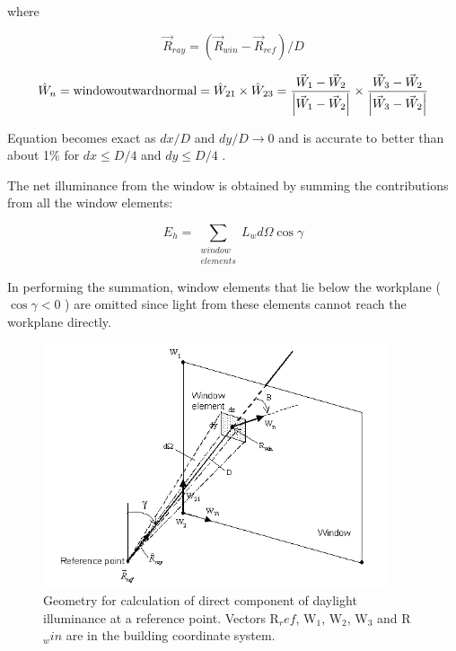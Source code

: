 where

\begin{equation}
{\vec R_{ray}} = ({\vec R_{win}} - {\vec R_{ref}})/D
\end{equation}

\begin{equation}
{\hat W_n} = {\rm{ window outward normal }} = {\hat W_{21}} \times {\hat W_{23}} = \frac{{{{\vec W}_1} - {{\vec W}_2}}}{{\left| {{{\vec W}_1} - {{\vec W}_2}} \right|}} \times \frac{{{{\vec W}_3} - {{\vec W}_2}}}{{\left| {{{\vec W}_3} - {{\vec W}_2}} \right|}}
\end{equation}

Equation becomes exact as \(dx/D\) and \(dy/D \to 0\) and is accurate to better than about 1\% for \(dx \le D/4\) and \(dy \le D/4\) .

The net illuminance from the window is obtained by summing the contributions from all the window elements:

\begin{equation}
{E_h} = \sum\limits_{\scriptstyle \substack{window \\ elements}} {{L_w}d\Omega \cos \gamma }
\end{equation}

In performing the summation, window elements that lie below the workplane (\(\cos \gamma < 0\) ) are omitted since light from these elements cannot reach the workplane directly.

\begin{figure}[hbtp] %
\centering
\includegraphics[width=0.9\textwidth, height=0.9\textheight, keepaspectratio=true]{media/image755.png}
\caption{  Geometry for calculation of direct component of daylight illuminance at a reference point. Vectors R\(_ref\), W\(_1\), W\(_2\), W\(_3\) and R\(_win\) are in the building coordinate system. \protect \label{fig:geometry-for-calculation-of-direct-component}}
\end{figure}

